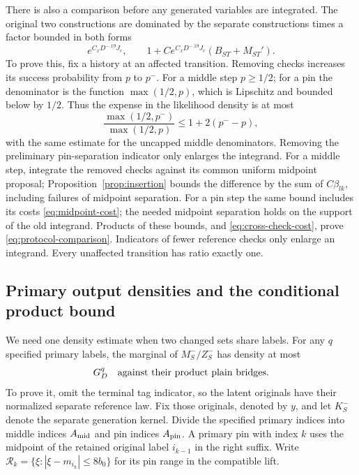 There is also a comparison before any generated variables are
integrated.  The original two constructions are dominated by the
separate constructions times a factor bounded in both forms
\begin{equation}\label{eq:protocol-comparison}
 e^{C_xD^{-.19}J_c},\qquad
 1+Ce^{C_xD^{-.19}J_c}(B_{ST}+M_{ST}').
\end{equation}
To prove this, fix a history at an affected transition.  Removing
checks increases its success probability from $p$ to $p^-$.  For a
middle step $p\ge1/2$; for a pin the denominator is the function
$\max(1/2,p)$, which is Lipschitz and bounded below by $1/2$.
Thus the expense in the likelihood density is at most
\[
 \frac{\max(1/2,p^-)}{\max(1/2,p)}\le1+2(p^--p),
\]
with the same estimate for the uncapped middle denominators.  Removing the preliminary pin-separation indicator
only enlarges the integrand.  For a middle step, integrate the
removed checks against its common uniform midpoint proposal;
Proposition~\ref{prop:insertion} bounds the difference by the sum
of $C\beta_{lk}$, including failures of midpoint separation.  For
a pin step the same bound includes its costs
\eqref{eq:midpoint-cost}; the needed midpoint separation holds
on the support of the old integrand.  Products of these bounds,
and \eqref{eq:cross-check-cost}, prove
\eqref{eq:protocol-comparison}.  Indicators of fewer reference
checks only enlarge an integrand.  Every unaffected transition
has ratio exactly one.

\subsection{Primary output densities and the conditional product bound}

We need one density estimate when two changed sets share labels.
For any $q$ specified primary labels, the marginal of $M_S^-/Z_S^-$
has density at most
\begin{equation}\label{eq:primary-density}
 G_D^q\quad\hbox{against their product plain bridges}.
\end{equation}
To prove it, omit the terminal tag indicator, so the latent originals
have their normalized separate reference law.  Fix those originals,
denoted by $y$, and let $K_S^-$ denote the separate generation kernel.
Divide the specified primary indices into middle indices $A_{\rm mid}$
and pin indices $A_{\rm pin}$.  A primary pin with index $k$ uses the
midpoint of the retained original label $i_{k-1}$ in the right suffix.
Write $\mathcal R_k=\{\xi:|\xi-m_{i_k}|\le8b_0\}$ for its pin range
in the compatible lift.


